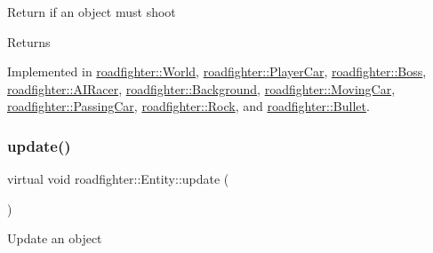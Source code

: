 Return if an object must shoot \begin{DoxyReturn}{Returns}

\end{DoxyReturn}


Implemented in \hyperlink{classroadfighter_1_1World_ab168eec31ad01a882254c5522b354d22}{roadfighter\+::\+World}, \hyperlink{classroadfighter_1_1PlayerCar_af9e034824497fb287085be08c3995733}{roadfighter\+::\+Player\+Car}, \hyperlink{classroadfighter_1_1Boss_a794027599b17398ae72c65aa1837d864}{roadfighter\+::\+Boss}, \hyperlink{classroadfighter_1_1AIRacer_a9e1ce152093bd4f7deb676c443a7851a}{roadfighter\+::\+A\+I\+Racer}, \hyperlink{classroadfighter_1_1Background_a1482152bca4207b44f1ce1c2c5af5847}{roadfighter\+::\+Background}, \hyperlink{classroadfighter_1_1MovingCar_a5b7a6cf114fe26016434b2fcf3434d37}{roadfighter\+::\+Moving\+Car}, \hyperlink{classroadfighter_1_1PassingCar_a16df11cb6ac5ce29b733d1063490c95c}{roadfighter\+::\+Passing\+Car}, \hyperlink{classroadfighter_1_1Rock_a1bcf89f9c386a3b248033ba3f0329e9c}{roadfighter\+::\+Rock}, and \hyperlink{classroadfighter_1_1Bullet_a0c093704ce5b9c2f4237d6b5dd1cbd36}{roadfighter\+::\+Bullet}.

\mbox{\label{classroadfighter_1_1Entity_a19cd353f12a3e8432acd6d5609137561}} 
\subsubsection{\texorpdfstring{update()}{update()}\hspace{0.1cm}{\footnotesize\ttfamily [1/2]}}
{\footnotesize\ttfamily virtual void roadfighter\+::\+Entity\+::update (\begin{DoxyParamCaption}{ }\end{DoxyParamCaption})\hspace{0.3cm}{\ttfamily [pure virtual]}}

Update an object 


